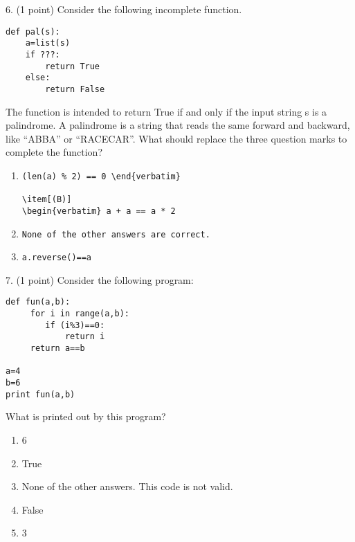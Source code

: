 \documentclass{article}
\newcounter{question}
\begin{document}
\noindent
\begin{minipage}{\textwidth}
6. (1 point)
Consider the following incomplete function.
\begin{verbatim}
def pal(s):
    a=list(s)
    if ???:
        return True
    else:
        return False
\end{verbatim}
The function is intended to return True if and only if the input string s is a palindrome. A palindrome is a string that reads the same forward and backward, like ``ABBA'' or ``RACECAR''. What should replace the three question marks to complete the function?

\begin{enumerate}
\item[(A)]
\begin{verbatim}(len(a) % 2) == 0 \end{verbatim}

\item[(B)]
\begin{verbatim} a + a == a * 2 \end{verbatim}

\item[(C)]
\begin{verbatim}None of the other answers are correct. \end{verbatim}

\item[(D)]
\begin{verbatim}a.reverse()==a \end{verbatim}

\end{enumerate}
\end{minipage}
\vspace{10em}
\filbreak\vfil{}\vfilneg

\noindent
\begin{minipage}{\textwidth}
7. (1 point)
Consider the following program:
\begin{verbatim}
def fun(a,b):
     for i in range(a,b):
        if (i%3)==0:
            return i
     return a==b

a=4
b=6
print fun(a,b)
\end{verbatim}
What is printed out by this program?

\begin{enumerate}
\item[(A)]
6

\item[(B)]
True

\item[(C)]
None of the other answers. This code is not valid.

\item[(D)]
False

\item[(E)]
3

\end{enumerate}
\end{minipage}
\vspace{10em}
\filbreak\vfil{}\vfilneg
\end{document}
